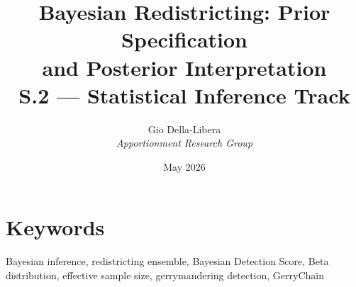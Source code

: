 \documentclass[12pt]{article}
\title{\textbf{Bayesian Redistricting: Prior Specification\\
and Posterior Interpretation}\\[0.4em]
\large S.2 --- Statistical Inference Track}
\author{Gio Della-Libera \\ \textit{Apportionment Research Group}}
\date{May 2026}
\begin{document}
\maketitle

\begin{abstract}

\end{abstract}

\section*{Keywords}
Bayesian inference, redistricting ensemble, Bayesian Detection Score, Beta distribution,
effective sample size, gerrymandering detection, GerryChain








\end{document}
